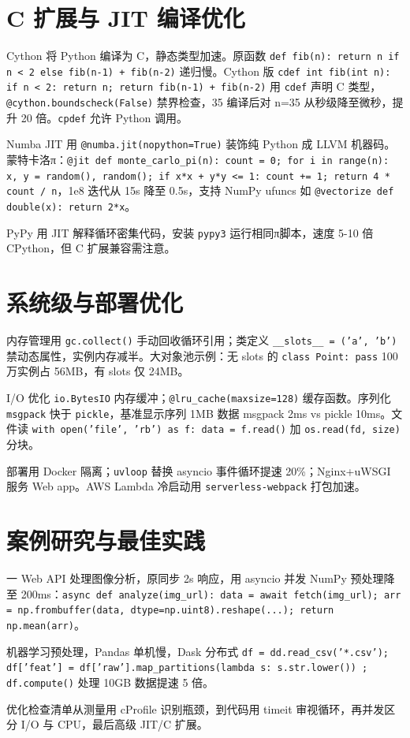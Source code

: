 \chapter{C 扩展与 JIT 编译优化}
Cython 将 Python 编译为 C，静态类型加速。原函数 \texttt{def fib(n): return n if n < 2 else fib(n-1) + fib(n-2)} 递归慢。Cython 版 \texttt{cdef int fib(int n): if n < 2: return n; return fib(n-1) + fib(n-2)} 用 \texttt{cdef} 声明 C 类型，\texttt{@cython.boundscheck(False)} 禁界检查，35 编译后对 n=35 从秒级降至微秒，提升 20 倍。\texttt{cpdef} 允许 Python 调用。\par
Numba JIT 用 \texttt{@numba.jit(nopython=True)} 装饰纯 Python 成 LLVM 机器码。蒙特卡洛π：\texttt{@jit def monte\_{}carlo\_{}pi(n): count = 0; for i in range(n): x, y = random(), random(); if x*x + y*y <= 1: count += 1; return 4 * count / n}，1e8 迭代从 15s 降至 0.5s，支持 NumPy ufuncs 如 \texttt{@vectorize def double(x): return 2*x}。\par
PyPy 用 JIT 解释循环密集代码，安装 \texttt{pypy3} 运行相同π脚本，速度 5-10 倍 CPython，但 C 扩展兼容需注意。\par
\chapter{系统级与部署优化}
内存管理用 \texttt{gc.collect()} 手动回收循环引用；类定义 \texttt{\_{}\_{}slots\_{}\_{} = ('a', 'b')} 禁动态属性，实例内存减半。大对象池示例：无 slots 的 \texttt{class Point: pass} 100 万实例占 56MB，有 slots 仅 24MB。\par
I/O 优化 \texttt{io.BytesIO} 内存缓冲；\texttt{@lru\_{}cache(maxsize=128)} 缓存函数。序列化 \texttt{msgpack} 快于 \texttt{pickle}，基准显示序列 1MB 数据 msgpack 2ms vs pickle 10ms。文件读 \texttt{with open('file', 'rb') as f: data = f.read()} 加 \texttt{os.read(fd, size)} 分块。\par
部署用 Docker 隔离；\texttt{uvloop} 替换 asyncio 事件循环提速 20\%{}；Nginx+uWSGI 服务 Web app。AWS Lambda 冷启动用 \texttt{serverless-webpack} 打包加速。\par
\chapter{案例研究与最佳实践}
一 Web API 处理图像分析，原同步 2s 响应，用 asyncio 并发 NumPy 预处理降至 200ms：\texttt{async def analyze(img\_{}url): data = await fetch(img\_{}url); arr = np.frombuffer(data, dtype=np.uint8).reshape(...); return np.mean(arr)}。\par
机器学习预处理，Pandas 单机慢，Dask 分布式 \texttt{df = dd.read\_{}csv('*.csv'); df['feat'] = df['raw'].map\_{}partitions(lambda s: s.str.lower()) ; df.compute()} 处理 10GB 数据提速 5 倍。\par
优化检查清单从测量用 cProfile 识别瓶颈，到代码用 timeit 审视循环，再并发区分 I/O 与 CPU，最后高级 JIT/C 扩展。\par
